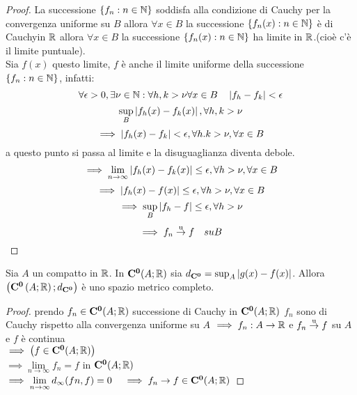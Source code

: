 \begin{proof}
	La successione $\left\{ f_n:n\in\mathbb{N}\right\}$ soddisfa alla condizione di Cauchy per la convergenza uniforme su $B$ allora $\forall x\in B$ la successione $\left\{ f_n(x) :n\in\mathbb{N} \right\}$ è di Cauchyin $ \mathbb{R}$ allora $\forall x \in B$ la successione $\left\{ f_n(x):n\in\mathbb{N} \right\}$ ha limite in $ \mathbb{R}$.(cioè c'è il limite puntuale).\\
	Sia $f(x)$ questo limite, $f$ è anche il limite uniforme della successione $\left\{ f_n:n\in\mathbb{N} \right\}$, infatti:
	\[\forall\epsilon>0, \exists\nu\in\mathbb{N}: \forall h,k>\nu \forall x\in B \quad \left|f_h-f_k\right|<\epsilon\]
	\[\sup\limits_B\left|f_h(x)-f_k(x)\right|, \forall h,k>\nu\]
	\[\implies \left|f_h(x)-f_k\right|<\epsilon,\forall h.k>\nu, \forall x \in B\]
	a questo punto si passa al limite e la disuguaglianza diventa debole.
	\[\implies \lim\limits_{n\to\infty}\left|f_h(x)-f_k(x)\right| \leq \epsilon, \forall h>\nu, \forall x\in B\]
	\[\implies \left|f_h(x)-f(x)\right| \leq \epsilon, \forall h>\nu, \forall x\in B\]
	\[\implies \sup\limits_B\left|f_h-f\right| \leq \epsilon, \forall h>\nu\]
	\[\implies f_n \overset{\text{u}}{\to} f\quad su B\]
\end{proof}
\begin{proposition}
	\label{prop:dist_unif_sp_metr_compl}
	Sia $A$ un compatto in $ \mathbb{R}$. In $\mathbf{C^{0}}(A; \mathbb{R})$ sia $d_{\mathbf{C^{0}}}=\sup_A\left|g(x)-f(x)\right|$. Allora $\left( \mathbf{C^{0}}\left(A; \mathbb{R}\right);d_{\mathbf{C^{0}}}\right)$ è uno spazio metrico completo.
	\begin{proof}
		prendo $f_n\in \mathbf{C^{0}}(A; \mathbb{R})$ successione di Cauchy in $\mathbf{C^{0}}(A; \mathbb{R})$
		$f_n$ sono di Cauchy rispetto alla convergenza uniforme su $A$
		$\implies f_n:A\to \mathbb{R}$ e $f_n \overset{\text{u}}{\to} f$ su $A$ e $f$ è continua\\ $\implies\left(f\in \mathbf{C^{0}}(A; \mathbb{R})\right)$\\
		$\implies\lim\limits_{n\to\infty}f_n=f$ in $\mathbf{C^{0}}(A; \mathbb{R})$\\
		$\implies\lim\limits_{n\to\infty}d_{\infty}(fn,f)=0\quad \implies f_n\to f\in \mathbf{C^{0}}(A; \mathbb{R})$
	\end{proof}
\end{proposition}
\begin{corollary} %
	\label{prop:compl_dist_spm_compl}
\end{corollary}

